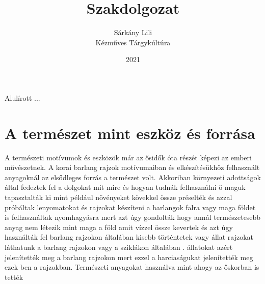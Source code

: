 \documentclass[fontsize=12pt, appendixprefix=true]{scrreprt}
\author{Sárkány Lili\\Kézműves Tárgykúltúra}
\title{Szakdolgozat}
\date{2021}
\newcommand{\pushtobottom}{\vspace*{\fill}}
\newcommand{\signatureline}[1]{\begin{flushright}
	\vspace*{.5cm}\par\noindent\makebox[2.5in]{\hrulefill}
	\par\noindent\makebox[2.5in][c]{#1}
	\end{flushright}
}
\begin{document}
\maketitle

Alulírott ...
\pushtobottom
\signatureline{Aláírás}

\tableofcontents
%

\chapter{A természet mint eszköz és forrása}
A természeti motívumok és eszközök már az ősidők óta részét képezi az emberi művészetnek. \cite{domonkos1981magyarorszagi} A korai barlang rajzok motívumaiban és elkészítésükhöz felhasznált \cite{tiborindigokemia} anyagoknál az elsődleges forrás a természet volt.
Akkoriban környezeti adottságok által fedeztek fel a dolgokat mit mire és hogyan tudnák felhasználni ö maguk tapasztalták ki mint például növényeket kövekkel össze préselték és azzal próbáltak lenyomatokat és rajzokat készíteni a barlangok falra vagy maga földet is felhasználtak nyomhagyásra mert 
azt úgy gondolták hogy annál természetesebb anyag  nem létezik mint maga a föld amit vízzel össze kevertek és azt úgy használták fel barlang rajzokon általában kisebb történtetek vagy állat rajzokat láthatunk a barlang rajzokon vagy a sziklákon általában .
állatokat azért jelenítették meg a barlang rajzokon mert ezzel a harciaságukat jelenítették meg  ezek ben a rajzokban.
Természeti anyagokat használva mint ahogy az őskorban is tették 
 
\end{document}
